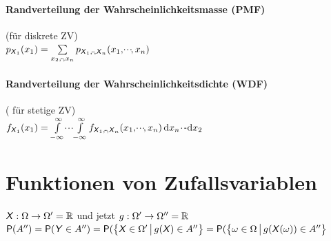 \documentclass[german,color,6pt]{latex4ei/latex4ei_sheet}
\begin{document}
\begin{sectionbox}
	\paragraph{Randverteilung der Wahrscheinlichkeitsmasse (PMF)}
	(für diskrete ZV) \\
	$p_{\X_1}(x_1) = \sum\limits_{x_2,\shdots,x_n}{p_{\X_1,\shdots,\X_n}(x_1,\shdots,x_n)}$
	
	\paragraph{Randverteilung der Wahrscheinlichkeitsdichte (WDF)} ( für stetige ZV) \\
	$f_{\X_1}(x_1) = \int\limits_{-\infty}^{\infty}{\shdots\int\limits_{-\infty}^{\infty}{f_{\X_1,\shdots,\X_n}(x_1,\shdots,x_n)\diff x_n\shdots}\diff x_2}$
\end{sectionbox}



\section{Funktionen von Zufallsvariablen}
\begin{sectionbox}
	$\operatorname{\textsf{\textit{X}}}: \Omega \rightarrow \Omega' = \operatorname{\mathbb R}$ und jetzt $g:\Omega' \rightarrow \Omega'' = \operatorname{\mathbb R}$\\
	$\operatorname{\textsf{P}}(A'') = \operatorname{\textsf{P}}(\operatorname{\textsf{\textit{Y}}} \in A'') = \operatorname{\textsf{P}}(\bigl\{ \bigl. \operatorname{\textsf{\textit{X}}} \in \Omega' \, \bigr| \, g(\operatorname{\textsf{\textit{X}}}) \in A'' \bigr\} = \operatorname{\textsf{P}}(\bigl\{ \bigl. \omega \in \Omega \, \bigr| \, g(\operatorname{\textsf{\textit{X}}}(\omega)) \in A'' \bigr\}$
\end{sectionbox}
\end{document}
